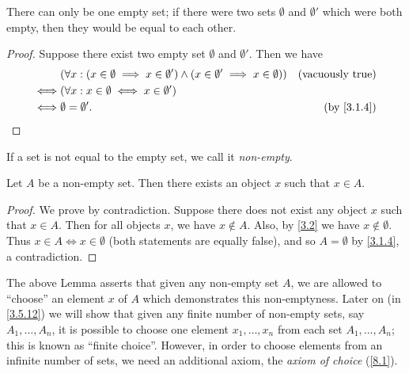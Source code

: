 \begin{additional corollary}\label{ac 3.1.2}
There can only be one empty set;
if there were two sets \(\emptyset\) and \(\emptyset'\) which were both empty, then they would be equal to each other.
\end{additional corollary}

\begin{proof}
  Suppose there exist two empty set \(\emptyset\) and \(\emptyset'\).
  Then we have
  \begin{align*}
         & (\forall x : (x \in \emptyset \implies x \in \emptyset') \land (x \in \emptyset' \implies x \in \emptyset)) & \text{(vacuously true)}  \\
    \iff & (\forall x : x \in \emptyset \iff x \in \emptyset')                                                                                    \\
    \iff & \emptyset = \emptyset'.                                                                                     & \text{(by \cref{3.1.4})}
  \end{align*}
\end{proof}

\begin{note}
  If a set is not equal to the empty set, we call it \emph{non-empty}.
\end{note}

\setcounter{theorem}{5}
\begin{lemma}\label{3.1.6}
  Let \(A\) be a non-empty set.
  Then there exists an object \(x\) such that \(x \in A\).
\end{lemma}

\begin{proof}
  We prove by contradiction.
  Suppose there does not exist any object \(x\) such that \(x \in A\).
  Then for all objects \(x\), we have \(x \notin A\).
  Also, by \cref{3.2} we have \(x \notin \emptyset\).
  Thus \(x \in A \iff x \in \emptyset\) (both statements are equally false), and so \(A = \emptyset\) by \cref{3.1.4}, a contradiction.
\end{proof}

\begin{remark}\label{3.1.7}
  The above Lemma asserts that given any non-empty set \(A\), we are allowed to ``choose'' an element \(x\) of \(A\) which demonstrates this non-emptyness.
  Later on (in \cref{3.5.12}) we will show that given any finite number of non-empty sets, say \(A_1, \dots, A_n\), it is possible to choose one element \(x_1, \dots, x_n\) from each set \(A_1, \dots, A_n\);
  this is known as ``finite choice''.
  However, in order to choose elements from an infinite number of sets, we need an additional axiom, the \emph{axiom of choice} (\cref{8.1}).
\end{remark}

